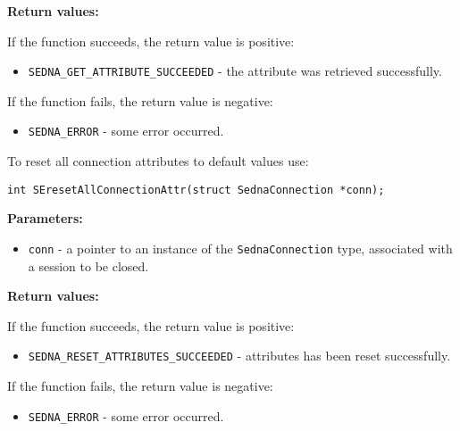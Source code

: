 \documentclass[a4paper,12pt]{article}
\newenvironment{citemize}
{\begin{itemize}
  \setlength{\itemsep}{0pt}
  \setlength{\parskip}{0pt}
  \setlength{\parsep}{0pt}}
{\end{itemize}}
\begin{document}
\noindent
\textbf{Return values:}

\medskip

\noindent
If the function succeeds, the return value is positive:

\begin{citemize}
\item\verb!SEDNA_GET_ATTRIBUTE_SUCCEEDED! - the attribute was retrieved
successfully.
\end{citemize}

\noindent
If the function fails, the return value is negative:

\begin{citemize}
\item\verb!SEDNA_ERROR! - some error occurred.
\end{citemize}

To reset all connection attributes to default values use:

\begin{verbatim}
int SEresetAllConnectionAttr(struct SednaConnection *conn);
\end{verbatim}

\noindent
\textbf{Parameters:}

\begin{citemize}
\item\verb!conn! - a pointer to an instance of the \verb!SednaConnection! type,
associated with a session to be closed.
\end{citemize}

\noindent
\textbf{Return values:}

\medskip

\noindent
If the function succeeds, the return value is positive:

\begin{citemize}
\item\verb!SEDNA_RESET_ATTRIBUTES_SUCCEEDED! - attributes has been reset
successfully.
\end{citemize}

\noindent
If the function fails, the return value is negative:

\begin{citemize}
\item\verb!SEDNA_ERROR! - some error occurred.
\end{citemize}


\end{document}
